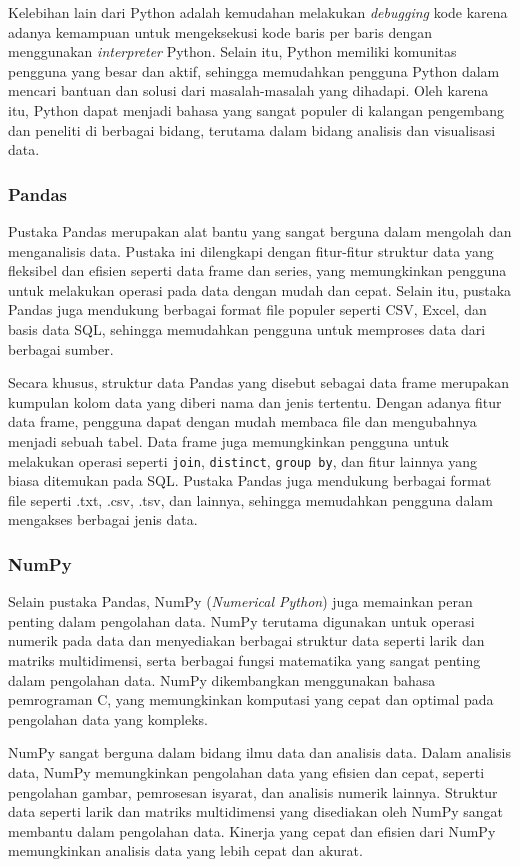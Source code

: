 Kelebihan lain dari Python adalah kemudahan melakukan \textit{debugging} kode karena adanya kemampuan untuk mengeksekusi kode baris per baris dengan menggunakan \textit{interpreter} Python. Selain itu, Python memiliki komunitas pengguna yang besar dan aktif, sehingga memudahkan pengguna Python dalam mencari bantuan dan solusi dari masalah-masalah yang dihadapi. Oleh karena itu, Python dapat menjadi bahasa yang sangat populer di kalangan pengembang dan peneliti di berbagai bidang, terutama dalam bidang analisis dan visualisasi data.

\subsubsection{Pandas}
Pustaka Pandas merupakan alat bantu yang sangat berguna dalam mengolah dan menganalisis data. Pustaka ini dilengkapi dengan fitur-fitur struktur data yang fleksibel dan efisien seperti data frame dan series, yang memungkinkan pengguna untuk melakukan operasi pada data dengan mudah dan cepat. Selain itu, pustaka Pandas juga mendukung berbagai format file populer seperti CSV, Excel, dan basis data SQL, sehingga memudahkan pengguna untuk memproses data dari berbagai sumber.

Secara khusus, struktur data Pandas yang disebut sebagai data frame merupakan kumpulan kolom data yang diberi nama dan jenis tertentu. Dengan adanya fitur data frame, pengguna dapat dengan mudah membaca file dan mengubahnya menjadi sebuah tabel. Data frame juga memungkinkan pengguna untuk melakukan operasi seperti \texttt{join}, \texttt{distinct}, \texttt{group by}, dan fitur lainnya yang biasa ditemukan pada SQL. Pustaka Pandas juga mendukung berbagai format file seperti .txt, .csv, .tsv, dan lainnya, sehingga memudahkan pengguna dalam mengakses berbagai jenis data.

\subsubsection{NumPy}
Selain pustaka Pandas, NumPy (\textit{Numerical Python}) juga memainkan peran penting dalam pengolahan data. NumPy terutama digunakan untuk operasi numerik pada data dan menyediakan berbagai struktur data seperti larik dan matriks multidimensi, serta berbagai fungsi matematika yang sangat penting dalam pengolahan data. NumPy dikembangkan menggunakan bahasa pemrograman C, yang memungkinkan komputasi yang cepat dan optimal pada pengolahan data yang kompleks.

NumPy sangat berguna dalam bidang ilmu data dan analisis data. Dalam analisis data, NumPy memungkinkan pengolahan data yang efisien dan cepat, seperti pengolahan gambar, pemrosesan isyarat, dan analisis numerik lainnya. Struktur data seperti larik dan matriks multidimensi yang disediakan oleh NumPy sangat membantu dalam pengolahan data. Kinerja yang cepat dan efisien dari NumPy memungkinkan analisis data yang lebih cepat dan akurat.

